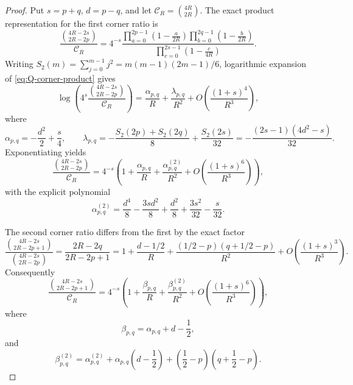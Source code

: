 \documentclass[11pt]{article}
\theoremstyle{definition}
\theoremstyle{remark}
\begin{document}
\begin{proof}
Put \(s=p+q\), \(d=p-q\), and let
\(\mathscr C_R=\binom{4R}{2R}\).  The exact product representation for the
first corner ratio is
\begin{equation}
 \frac{\binom{4R-2s}{2R-2p}}{\mathscr C_R}
 =4^{-s}
 \frac{
   \displaystyle\prod_{a=0}^{2p-1}\left(1-\frac{a}{2R}\right)
   \displaystyle\prod_{b=0}^{2q-1}\left(1-\frac{b}{2R}\right)}
  {\displaystyle\prod_{c=0}^{2s-1}\left(1-\frac{c}{4R}\right)}.
 \label{eq:Q-corner-product}
\end{equation}
Writing
\(S_2(m)=\sum_{j=0}^{m-1}j^2=m(m-1)(2m-1)/6\), logarithmic expansion of
\eqref{eq:Q-corner-product} gives
\begin{equation}
 \log\!\left(
 4^s\frac{\binom{4R-2s}{2R-2p}}{\mathscr C_R}\right)
 =\frac{\alpha_{p,q}}R+\frac{\lambda_{p,q}}{R^2}
 +O\!\left(\frac{(1+s)^4}{R^3}\right),
 \label{eq:Q-corner-log-second}
\end{equation}
where
\begin{equation}
 \alpha_{p,q}=-\frac{d^2}{2}+\frac{s}{4},
 \qquad
 \lambda_{p,q}
 =-\frac{S_2(2p)+S_2(2q)}8+\frac{S_2(2s)}{32}
 =-\frac{(2s-1)(4d^2-s)}{32}.
 \label{eq:alpha-lambda-corner}
\end{equation}
Exponentiating yields
\begin{equation}
 \frac{\binom{4R-2s}{2R-2p}}{\mathscr C_R}
 =4^{-s}\left(
 1+\frac{\alpha_{p,q}}R
 +\frac{\alpha^{(2)}_{p,q}}{R^2}
 +O\!\left(\frac{(1+s)^6}{R^3}\right)\right),
 \label{eq:Q-corner-second-local}
\end{equation}
with the explicit polynomial
\begin{equation}
 {
 \alpha^{(2)}_{p,q}
 =\frac{d^4}{8}-\frac{3sd^2}{8}
 +\frac{d^2}{8}+\frac{3s^2}{32}-\frac{s}{32}.}
 \label{eq:alpha-second-polynomial}
\end{equation}

The second corner ratio differs from the first by the exact factor
\begin{equation}
 \frac{\binom{4R-2s}{2R-2p+1}}
      {\binom{4R-2s}{2R-2p}}
 =\frac{2R-2q}{2R-2p+1}
 =1+\frac{d-1/2}{R}
 +\frac{(1/2-p)(q+1/2-p)}{R^2}
 +O\!\left(\frac{(1+s)^3}{R^3}\right).
 \label{eq:P-over-Q-local-factor}
\end{equation}
Consequently
\begin{equation}
 \frac{\binom{4R-2s}{2R-2p+1}}{\mathscr C_R}
 =4^{-s}\left(
 1+\frac{\beta_{p,q}}R
 +\frac{\beta^{(2)}_{p,q}}{R^2}
 +O\!\left(\frac{(1+s)^6}{R^3}\right)\right),
 \label{eq:P-corner-second-local}
\end{equation}
where
\begin{equation}
 \beta_{p,q}=\alpha_{p,q}+d-\frac12,
 \label{eq:beta-first-polynomial}
\end{equation}
and
\begin{equation}
 {
 \beta^{(2)}_{p,q}
 =\alpha^{(2)}_{p,q}
 +\alpha_{p,q}\left(d-\frac12\right)
 +\left(\frac12-p\right)\left(q+\frac12-p\right).}
 \label{eq:beta-second-polynomial}
\end{equation}


\end{proof}
\end{document}
